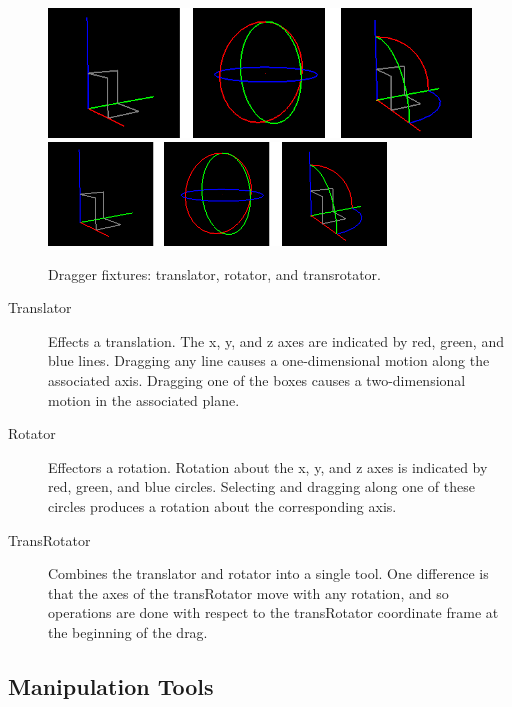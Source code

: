 \documentclass{article}
\begin{document}
\begin{figure}
\begin{center}
\iflatexml
\includegraphics[]{images/transformTools}
\else
\includegraphics[width=0.80\textwidth]{images/transformTools}
\fi
\end{center}
\caption{Dragger fixtures: translator, rotator, and transrotator.}%
\label{transformToolsFig}
\end{figure}

\begin{description}

\item[Translator]\mbox{}

Effects a translation. The x, y, and z axes are
indicated by red, green, and blue lines. Dragging any line causes
a one-dimensional motion along the associated axis. Dragging one
of the boxes causes a two-dimensional motion in the associated plane.

\item[Rotator]\mbox{}

Effectors a rotation. Rotation about the
x, y, and z axes is indicated by red, green, and blue circles.
Selecting and dragging along one of these circles produces
a rotation about the corresponding axis.

\item[TransRotator]\mbox{}

Combines the translator and rotator into a single tool. One difference
is that the axes of the transRotator move with any rotation,
and so operations are done with respect to the transRotator coordinate frame
at the beginning of the drag.

\end{description}

\subsection{Manipulation Tools}
\label{ManipulationToolsSec}
\end{document}
